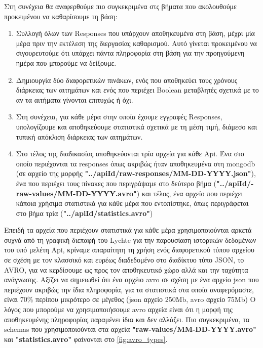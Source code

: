 Στη συνέχεια θα αναφερθούμε πιο συγκεκριμένα στς βήματα που ακολουθούμε προκειμένου να καθαρίσουμε τη βάση:

\begin{enumerate}
	\item Συλλογή όλων των Responses που υπάρχουν αποθηκευμένα στη βάση, μέχρι μία μέρα πριν την εκτέλεση της διεργασίας καθαρισμού. Αυτό γίνεται προκειμένου να σιγουρευτούμε ότι υπάρχει πάντα πληροφορία στη βάση για την προηγούμενη ημέρα που μπορούμε να δείξουμε.
	\item Δημιουργία δύο διαφορετικών πινάκων, ενός που αποθηκεύει τους χρόνους διάρκειας των αιτημάτων και ενός που περιέχει Boolean μεταβλητές σχετικά με το αν τα αιτήματα γίνονται επιτυχώς ή όχι.
	\item Στη συνέχεια, για κάθε μέρα στην οποία έχουμε εγγραφές Responses, υπολογίζουμε και αποθηκεύουμε στατιστικά σχετικά με τη μέση τιμή, διάμεσο και τυπική απόκλιση διάρκειας των αιτημάτων.
	\item Στο τέλος της διαδικασίας αποθηκεύονται τρία αρχεία για κάθε Api. Ένα στο οποίο περιέχονται τα responses όπως ακριβώς ήταν αποθηκευμένα στη mongodb (σε αρχείο της μορφής \textbf{"../apiId/raw-responses/MM-DD-YYYY.json"}), ένα που περιέχει τους πίνακες που περιγράψαμε στο δεύτερο βήμα (\textbf{"../apiId/\hyp{}raw-values/MM-DD-YYYY.avro"}) και τέλος, ένα αρχείο που περιέχει κάποια χρήσιμα στατιστικά για κάθε μέρα που εντοπίστηκε, όπως περιγράφεται στο βήμα τρία (\textbf{"../apiId/statistics.avro"}) 
\end{enumerate}

Επειδή τα αρχεία που περιέχουν στατιστικά για κάθε μέρα χρησιμοποιούνται αρκετά συχνά από τη γραφική διεπαφή του Lychte για την παρουσίαση ιστορικών δεδομένων του υπό μελέτη Api, κρίναμε απαραίτητη τη χρήση ενός διαφορετικού τύπου αρχείου σε σχέση με
τον κλασσικό και ευρέως διαδεδομένο στο διαδίκτυο τύπο JSON, το AVRO, για να κερδίσουμε ως προς τον αποθηκευτικό χώρο αλλά και την ταχύτητα ανάγνωσης. Αξίζει να σημειωθεί ότι ένα αρχέιο avro σε σχέση με ένα αρχείο json που περιέχουν ακριβώς την ίδια
πληροφορία, για τα στατιστικά στα οποία αναφερόμαστε, είναι 70\% περίπου μικρότερο σε μέγεθος (json αρχείο 250Μb, avro αρχείο 75Μb)
Ο λόγος που μπορούμε να χρησιμοποιήσουμε avro αρχεία είναι ότι η μορφή της αποθηκευμένης πληροφορίας παραμένει ίδια και δεν αλλάζει. Πιο συγκεκριμένα, τα schemas που χρησιμοποιούνται στα αρχεία \textbf{"raw-values/MM-DD-YYYY.avro"} και \textbf{"statistics.avro"}
φαίνονται στο \autoref{fig:avro_types}.

